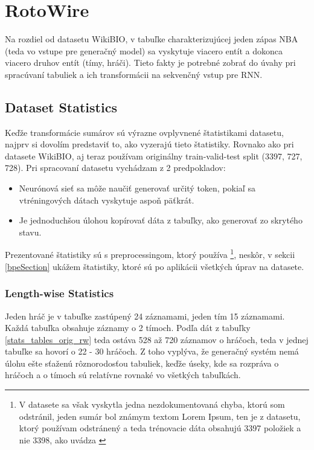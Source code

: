 \section{RotoWire}

Na rozdiel od datasetu WikiBIO, v tabuľke charakterizujúcej jeden zápas NBA (teda vo vstupe pre generačný model) sa vyskytuje viacero entít a dokonca viacero druhov entít (tímy, hráči). Tieto fakty je potrebné zobrať do úvahy pri spracúvaní tabuliek a ich transformácii na sekvenčný vstup pre RNN.

\subsection{Dataset Statistics} \label{assumptions_ref}

Keďže transformácie sumárov sú výrazne ovplyvnené štatistikami datasetu, najprv si dovolím predstaviť to, ako vyzerajú tieto štatistiky. Rovnako ako pri datasete WikiBIO, aj teraz používam originálny train-valid-test split (3397, 727, 728). Pri spracovaní datasetu vychádzam z 2 predpokladov:
\begin{itemize}
\item Neurónová sieť sa môže naučiť generovať určitý token, pokiaľ sa v\linebreak[4]tréningových dátach vyskytuje aspoň päťkrát.
\item Je jednoduchšou úlohou kopírovať dáta z tabuľky, ako generovať zo skrytého stavu.
\end{itemize}

Prezentované štatistiky sú s preprocessingom, ktorý používa \citep{wiseman2017} \footnote{V datasete sa však vyskytla jedna nezdokumentovaná chyba, ktorú som odstránil, jeden sumár bol známym textom Lorem Ipsum, ten je z datasetu, ktorý používam odstránený a teda trénovacie dáta obsahujú 3397 položiek a nie 3398, ako uvádza \citep{wiseman2017} \label{footnote_wis_fault_li}}, neskôr, v sekcii \ref{bpeSection} ukážem štatistiky, ktoré sú po aplikácii všetkých úprav na datasete.

\subsubsection{Length-wise Statistics}

Jeden hráč je v tabuľke zastúpený 24 záznamami, jeden tím 15 záznamami. Každá tabuľka obsahuje záznamy o 2 tímoch. Podľa dát z tabuľky \ref{stats_tables_orig_rw} teda ostáva 528 až 720 záznamov o hráčoch, teda v jednej tabuľke sa hovorí o 22 - 30 hráčoch. Z toho vyplýva, že generačný systém nemá úlohu ešte sťaženú rôznorodosťou tabuliek, keďže úseky, kde sa rozpráva o hráčoch a o tímoch sú relatívne rovnaké vo všetkých tabuľkách.

